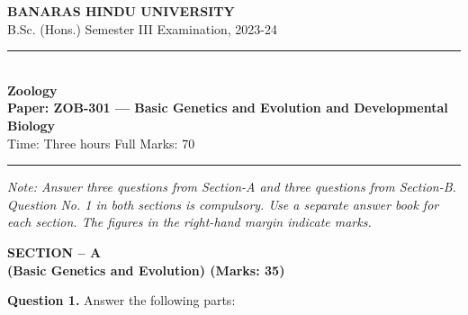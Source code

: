 \documentclass[11pt,a4paper]{article}
\begin{document}
\begin{center}
  {\large\bfseries BANARAS HINDU UNIVERSITY}\\[2pt]
  {\normalsize B.Sc. (Hons.) Semester III Examination, 2023-24}\\[6pt]
  \rule{0.8\linewidth}{0.5pt}\\[6pt]
  {\large\bfseries Zoology}\\[4pt]
  {\large\bfseries Paper: ZOB-301 --- Basic Genetics and Evolution and Developmental Biology}\\[4pt]
  {\normalsize Time: Three hours \hfill Full Marks: 70}
\end{center}

\rule{\linewidth}{0.4pt}

\smallskip



\noindent   \textit{Note: Answer three questions from Section-A and three questions from Section-B. Question No. 1 in both sections is compulsory. Use a separate answer book for each section. The figures in the right-hand margin indicate marks.}

\bigskip

\begin{center}
   \textbf{SECTION -- A} \\
   \textbf{(Basic Genetics and Evolution) (Marks: 35)}
\end{center}

\medskip


\noindent   \textbf{Question 1.} Answer the following parts:
\end{document}
